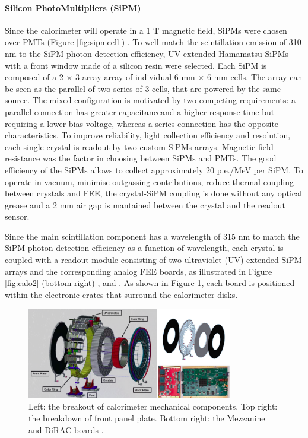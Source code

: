 \paragraph{Silicon PhotoMultipliers (SiPM)}
Since the calorimeter will operate in a 1 T magnetic field, SiPMs were chosen over PMTs (Figure \ref{fig:sipmcell}) \cite{em1}. 
To well match the scintillation emission of 310 nm to the SiPM photon detection efficiency, 
UV extended Hamamatsu SiPMs with a front window made of a silicon resin were selected. Each SiPM is composed of a
2 $\times$ 3 array array of individual 6 mm $\times$ 6 mm cells.
The array can be seen as the parallel of two series of 3 cells, that 
are powered by the same source. The mixed configuration is motivated by 
two competing requirements: a parallel connection has greater capacitanceand a higher response time 
but requiring a lower bias voltage, whereas 
a series connection has the opposite characteristics. 
To improve reliability, light collection efficiency and resolution, each single 
crystal is readout by two custom SiPMs arrays.
Magnetic field resistance was the factor in choosing between SiPMs and PMTs.
The good efficiency of the SiPMs allows to collect approximately 20 p.e./MeV per SiPM.
To operate in vacuum, minimise outgassing contributions, reduce 
thermal coupling between crystals and FEE, the crystal-SiPM 
coupling is done without any optical grease and a 2 mm air gap is mantained 
between the crystal and the readout sensor.

Since the main scintillation component has a wavelength of 315 nm to match the SiPM
photon detection efficiency as a function of wavelength, each crystal is coupled with a readout 
module consisting of two ultraviolet (UV)-extended SiPM arrays
and the corresponding analog FEE boards, as illustrated in Figure 
\ref{fig:calo2} (bottom right) \cite{em5}, \cite{em2} and \cite{em3}. 
As shown in Figure \ref{fig:calo3}, each board is positioned within the electronic 
crates that surround the calorimeter disks.
\begin{figure}[!h]
        \centering
        \includegraphics[width =0.8\textwidth]{figures/png/Screenshot_20240322_121017.png}
        \caption[The breakout of calorimeter mechanical components.]{Left: the breakout of calorimeter mechanical components. Top right: the breakdown of front
        panel plate. Bottom right: the Mezzanine and DiRAC boards \cite{em4}.}
        \label{fig:calo3}
        \end{figure}


